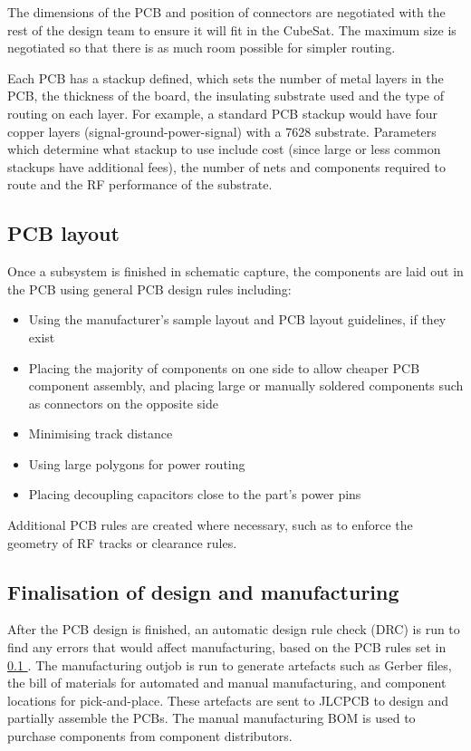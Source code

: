 \documentclass{report}
\newcommand*{\fullref}[1]{\hyperref[{#1}]{\ref*{#1} \nameref*{#1}}}
\begin{document}
The dimensions of the PCB and position of connectors are negotiated with the rest of the design team to ensure it will fit in the CubeSat. The maximum size is negotiated so that there is as much room possible for simpler routing.

Each PCB has a stackup defined, which sets the number of metal layers in the PCB, the thickness of the board, the insulating substrate used and the type of routing on each layer. For example, a standard PCB stackup would have four copper layers (signal-ground-power-signal) with a 7628 substrate. Parameters which determine what stackup to use include cost (since large or less common stackups have additional fees), the number of nets and components required to route and the RF performance of the substrate.

\subsection{PCB layout}
\label{sec:pcb-layout}

Once a subsystem is finished in schematic capture, the components are laid out in the PCB using general PCB design rules including:

\begin{itemize}
  \item Using the manufacturer's sample layout and PCB layout guidelines, if they exist
  \item Placing the majority of components on one side to allow cheaper PCB component assembly, and placing large or manually soldered components such as connectors on the opposite side
  \item Minimising track distance
  \item Using large polygons for power routing
  \item Placing decoupling capacitors close to the part's power pins
\end{itemize}


Additional PCB rules are created where necessary, such as to enforce the geometry of RF tracks or clearance rules.

\subsection{Finalisation of design and manufacturing}

After the PCB design is finished, an automatic design rule check (DRC) is run to find any errors that would affect manufacturing, based on the PCB rules set in \fullref{sec:pcb-layout}. The manufacturing outjob is run to generate artefacts such as Gerber files, the bill of materials for automated and manual manufacturing, and component locations for pick-and-place. These artefacts are sent to JLCPCB to design and partially assemble the PCBs. The manual manufacturing BOM is used to purchase components from component distributors.
\end{document}

